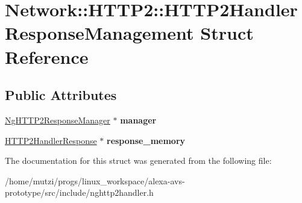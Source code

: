 \hypertarget{structNetwork_1_1HTTP2_1_1HTTP2HandlerResponseManagement}{}\section{Network\+:\+:H\+T\+T\+P2\+:\+:H\+T\+T\+P2\+Handler\+Response\+Management Struct Reference}
\label{structNetwork_1_1HTTP2_1_1HTTP2HandlerResponseManagement}
\subsection*{Public Attributes}
\begin{DoxyCompactItemize}
\item 
\mbox{\label{structNetwork_1_1HTTP2_1_1HTTP2HandlerResponseManagement_a06e2de580e20b608db15f6d42a35666a}} 
\hyperlink{classNetwork_1_1HTTP2_1_1NgHTTP2ResponseManager}{Ng\+H\+T\+T\+P2\+Response\+Manager} $\ast$ {\bfseries manager}
\item 
\mbox{\label{structNetwork_1_1HTTP2_1_1HTTP2HandlerResponseManagement_a198d98197519e981af7ef7cdc4811f1b}} 
\hyperlink{structNetwork_1_1HTTP2_1_1HTTP2HandlerResponse}{H\+T\+T\+P2\+Handler\+Response} $\ast$ {\bfseries response\+\_\+memory}
\end{DoxyCompactItemize}


The documentation for this struct was generated from the following file\+:\begin{DoxyCompactItemize}
\item 
/home/mutzi/progs/linux\+\_\+workspace/alexa-\/avs-\/prototype/src/include/nghttp2handler.\+h\end{DoxyCompactItemize}
